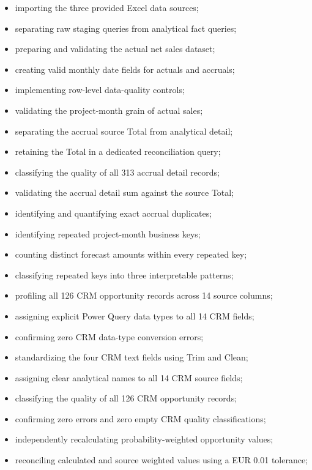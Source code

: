 \documentclass[11pt,a4paper]{article}
\begin{document}
\begin{itemize}[leftmargin=7mm,itemsep=3pt]
    \item importing the three provided Excel data sources;
    \item separating raw staging queries from analytical fact queries;
    \item preparing and validating the actual net sales dataset;
    \item creating valid monthly date fields for actuals and accruals;
    \item implementing row-level data-quality controls;
    \item validating the project-month grain of actual sales;
    \item separating the accrual source Total from analytical detail;
    \item retaining the Total in a dedicated reconciliation query;
    \item classifying the quality of all 313 accrual detail records;
    \item validating the accrual detail sum against the source Total;
    \item identifying and quantifying exact accrual duplicates;
    \item identifying repeated project-month business keys;
    \item counting distinct forecast amounts within every repeated key;
    \item classifying repeated keys into three interpretable patterns;
    \item profiling all 126 CRM opportunity records across 14 source columns;
    \item assigning explicit Power Query data types to all 14 CRM fields;
    \item confirming zero CRM data-type conversion errors;
    \item standardizing the four CRM text fields using Trim and Clean;
    \item assigning clear analytical names to all 14 CRM source fields;
    \item classifying the quality of all 126 CRM opportunity records;
    \item confirming zero errors and zero empty CRM quality classifications;
    \item independently recalculating probability-weighted opportunity values;
    \item reconciling calculated and source weighted values using a EUR 0.01
    tolerance;

\end{itemize}
\end{document}
